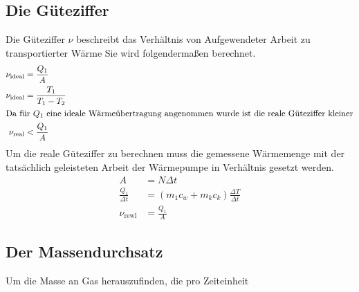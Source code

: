 \subsection{Die Güteziffer}
Die Güteziffer $ \nu $ beschreibt das Verhältnis von Aufgewendeter Arbeit zu transportierter Wärme \cite[vgl.][1]{man:v206}
Sie wird folgendermaßen berechnet.
\begin{align}
    \nu_{\text{ideal}} &= \frac{Q_{1}}{A} \\
    \nu_{\text{ideal}} &= \frac{T_1}{T_1 - T_2}\\
    \label{eq:gueteTheorie}
    \intertext{Da für $ Q_1 $ eine ideale Wärmeübertragung angenommen wurde ist die reale Güteziffer kleiner}
    \nu_{\text{real}} &< \frac{Q_{1}}{A} 
\end{align}
Um die reale Güteziffer zu berechnen muss die gemessene Wärmemenge mit der tatsächlich geleisteten
Arbeit der Wärmepumpe in Verhältnis gesetzt werden.
\begin{align}
    \nonumber A &= N \Delta t \\
    \nonumber \frac{Q_1}{\Delta t} &= (m_1 c_w + m_k c_k) \frac{\Delta T}{\Delta t} \\
    \nu_{\text{rewl}} &= \frac{Q_{1}}{A} 
    \label{eq:guetePraxis}
\end{align}



\subsection{Der Massendurchsatz}
Um die Masse an Gas herauszufinden, die pro Zeiteinheit 
